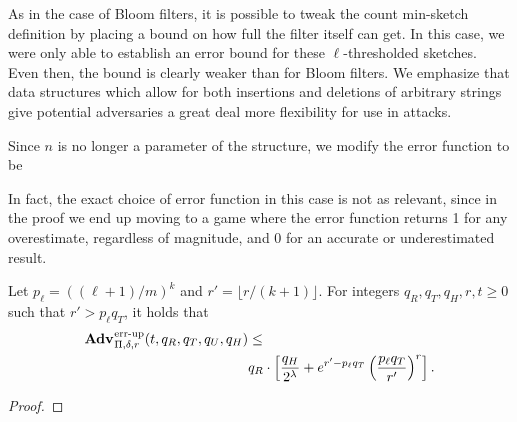 As in the case of Bloom filters, it is possible to tweak the count min-sketch
definition by placing a bound on how full the filter itself can get. In this
case, we were only able to establish an error bound for these $\ell$-thresholded
sketches. Even then, the bound is clearly weaker than for Bloom filters. We
emphasize that data structures which allow for both insertions and deletions of
arbitrary strings give potential adversaries a great deal more flexibility for
use in attacks.

Since $n$ is no longer a parameter of the structure, we modify the error
function to be %

In fact, the exact choice of error function in this case is not as relevant,
since in the proof we end up moving to a game where the error function returns
1 for any overestimate, regardless of magnitude, and 0 for an accurate or
underestimated result.

\begin{theorem}\label{thm:count-ms-bound}
Let $p_\ell = ((\ell+1)/m)^k$ and $r' = \lfloor r/(k+1) \rfloor$. For integers $q_R, q_T, q_H, r, t \geq 0$ such
that $r' > p_\ell q_T$, it holds that
  \begin{equation*}
  \begin{aligned}
    \Adv{\errep}_{\Pi,\delta,r}(t, q_R,q_T,q_U,q_H) &\leq \\
     & q_R \cdot \left[\frac{q_H}{2^\lambda} + e^{r'-p_\ell q_T}\left(\frac{p_\ell q_T}{r'}\right)^r\right].
  \end{aligned}
\end{equation*}
\end{theorem}

\begin{proof}
  
\end{proof}